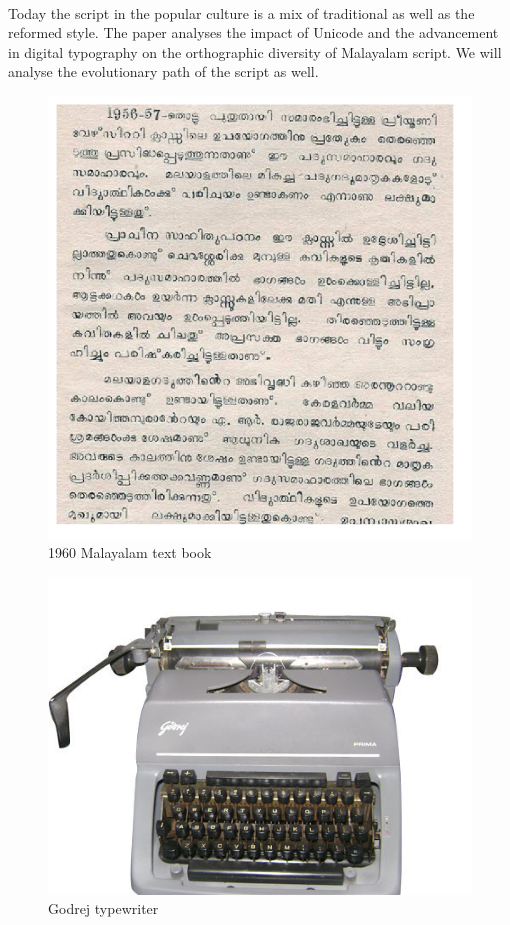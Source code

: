 \documentclass[10pt]{article}
\begin{document}
\paragraph{}
Today the script in the popular culture is a mix of traditional as well as the reformed style. The paper analyses the impact of Unicode and the advancement in digital typography on the orthographic diversity of Malayalam script. We will analyse the evolutionary path of the script as well.



\begin{figure}[h]
  \centering
   \includegraphics[width=1.0\textwidth]{images/1960-Textbook.png}
     \caption{1960 Malayalam text book}
\end{figure}



\begin{figure}
  \centering
   \includegraphics[width=1.0\textwidth]{images/godrej-typewriter.jpg}
     \caption{Godrej typewriter}
\end{figure}
\end{document}
